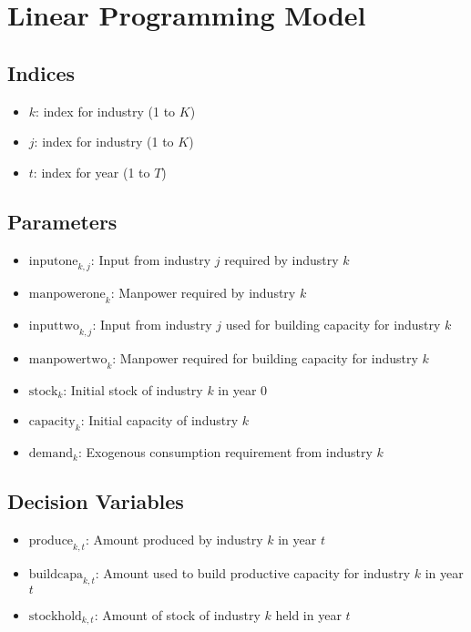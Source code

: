 \documentclass{article}
\begin{document}
\section*{Linear Programming Model}

\subsection*{Indices}
\begin{itemize}
    \item \( k \): index for industry (1 to \( K \))
    \item \( j \): index for industry (1 to \( K \))
    \item \( t \): index for year (1 to \( T \))
\end{itemize}

\subsection*{Parameters}
\begin{itemize}
    \item \( \text{inputone}_{k,j} \): Input from industry \( j \) required by industry \( k \)
    \item \( \text{manpowerone}_{k} \): Manpower required by industry \( k \)
    \item \( \text{inputtwo}_{k,j} \): Input from industry \( j \) used for building capacity for industry \( k \)
    \item \( \text{manpowertwo}_{k} \): Manpower required for building capacity for industry \( k \)
    \item \( \text{stock}_{k} \): Initial stock of industry \( k \) in year 0
    \item \( \text{capacity}_{k} \): Initial capacity of industry \( k \)
    \item \( \text{demand}_{k} \): Exogenous consumption requirement from industry \( k \)
\end{itemize}

\subsection*{Decision Variables}
\begin{itemize}
    \item \( \text{produce}_{k,t} \): Amount produced by industry \( k \) in year \( t \)
    \item \( \text{buildcapa}_{k,t} \): Amount used to build productive capacity for industry \( k \) in year \( t \)
    \item \( \text{stockhold}_{k,t} \): Amount of stock of industry \( k \) held in year \( t \)
\end{itemize}
\end{document}
